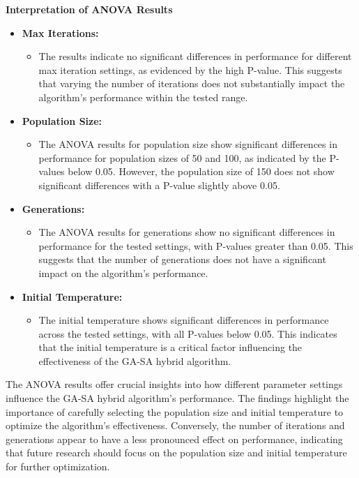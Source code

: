 \documentclass{article}
\begin{document}
    \textbf{Interpretation of ANOVA Results}

    \begin{itemize}
        \item \textbf{Max Iterations:}
        \begin{itemize}
            \item The results indicate no significant differences in performance for different max iteration settings, as evidenced by the high P-value. This suggests that varying the number of iterations does not substantially impact the algorithm's performance within the tested range.
        \end{itemize}
        \item \textbf{Population Size:}
        \begin{itemize}
            \item The ANOVA results for population size show significant differences in performance for population sizes of 50 and 100, as indicated by the P-values below 0.05. However, the population size of 150 does not show significant differences with a P-value slightly above 0.05.
        \end{itemize}
        \item \textbf{Generations:}
        \begin{itemize}
            \item The ANOVA results for generations show no significant differences in performance for the tested settings, with P-values greater than 0.05. This suggests that the number of generations does not have a significant impact on the algorithm's performance.
        \end{itemize}
        \item \textbf{Initial Temperature:}
        \begin{itemize}
            \item The initial temperature shows significant differences in performance across the tested settings, with all P-values below 0.05. This indicates that the initial temperature is a critical factor influencing the effectiveness of the GA-SA hybrid algorithm.
        \end{itemize}
    \end{itemize}

    The ANOVA results offer crucial insights into how different parameter settings influence the GA-SA hybrid algorithm's performance. The findings highlight the importance of carefully selecting the population size and initial temperature to optimize the algorithm's effectiveness. Conversely, the number of iterations and generations appear to have a less pronounced effect on performance, indicating that future research should focus on the population size and initial temperature for further optimization.
\end{document}
